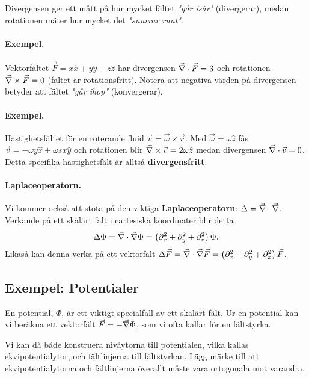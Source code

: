 \documentclass[%
oneside,                 %
final,                   %
10pt]{article}
\begin{document}
Divergensen ger ett mått på hur mycket fältet \emph{"går isär"} (divergerar), medan rotationen mäter hur mycket det \emph{"snurrar runt"}. 

\paragraph{Exempel.}
Vektorfältet $\vec{F} = x\hat{x} + y\hat{y} + z\hat{z}$ har divergensen $\vec{\nabla} \cdot \vec{F} = 3$ och rotationen $\vec{\nabla} \times \vec{F} = 0$ (fältet är rotationsfritt). Notera att negativa värden på divergensen betyder att fältet \emph{"går ihop"} (konvergerar). 

\paragraph{Exempel.}
Hastighetsfältet för en roterande fluid $\vec{v} = \vec{\omega} \times \vec{r}$. Med $\vec{\omega} = \omega \hat{z}$ fås $\vec{v} = -\omega y\hat{x} + \omega sx\hat{y}$ och rotationen blir $\vec{\nabla} \times \vec{v} = 2 \omega \hat{z}$ medan divergensen $\vec{\nabla} \cdot \vec{v} = 0$. Detta specifika hastighetsfält är alltså \textbf{divergensfritt}.

\paragraph{Laplaceoperatorn.}
Vi kommer också att stöta på den viktiga \textbf{Laplaceoperatorn}: $\Delta = \vec{\nabla} \cdot \vec{\nabla}$. Verkande på ett skalärt fält i cartesiska koordinater blir detta
\begin{equation}
\Delta \Phi = \vec{\nabla} \cdot \vec{\nabla} \Phi = \left( \partial_x^2 + \partial_y^2 + \partial_z^2 \right) \Phi.
\end{equation}
Likaså kan denna verka på ett vektorfält $\Delta \vec{F} = \vec{\nabla} \cdot \vec{\nabla} \vec{F} = \left( \partial_x^2 + \partial_y^2 + \partial_z^2 \right) \vec{F}$.

\subsection{Exempel: Potentialer}

En potential, $\Phi$,  är ett viktigt specialfall av ett skalärt fält.  Ur en  potential kan vi beräkna ett vektorfält $\vec{F} = - \vec{\nabla} \Phi$, som vi ofta kallar för en fältstyrka.

Vi kan då både konstruera nivåytorna till potentialen, vilka kallas ekvipotentialytor, och fältlinjerna till fältstyrkan.  Lägg märke till att ekvipotentialytorna och fältlinjerna överallt måste vara ortogonala mot varandra.
\end{document}
